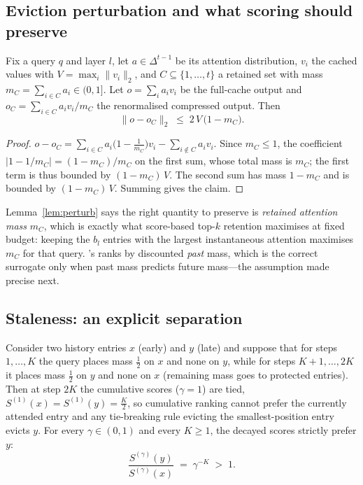\subsection{Eviction perturbation and what scoring should preserve}

\begin{lemma}\label{lem:perturb}
Fix a query $q$ and layer $l$, let $a\in\Delta^{t-1}$ be its attention
distribution, $v_i$ the cached values with
$V=\max_i\|v_i\|_2$, and $C\subseteq\{1,\dots,t\}$ a retained set with
mass $m_C=\sum_{i\in C}a_i\in(0,1]$. Let
$o=\sum_i a_i v_i$ be the full-cache output and
$o_C=\sum_{i\in C}a_i v_i/m_C$ the renormalised compressed output. Then
\begin{equation}
\|o-o_C\|_2 \;\le\; 2\,V\,\bigl(1-m_C\bigr).
\end{equation}
\end{lemma}

\begin{proof}
$o-o_C=\sum_{i\in C}a_i\bigl(1-\tfrac1{m_C}\bigr)v_i
-\sum_{i\notin C}a_i v_i$. Since $m_C\le1$, the coefficient
$|1-1/m_C|=(1-m_C)/m_C$ on the first sum, whose total mass is $m_C$;
the first term is thus bounded by $(1-m_C)\,V$. The second sum has mass
$1-m_C$ and is bounded by $(1-m_C)\,V$. Summing gives the claim.
\end{proof}

Lemma~\ref{lem:perturb} says the right quantity to preserve is
\emph{retained attention mass} $m_C$, which is exactly what score-based
top-$k$ retention maximises at fixed budget: keeping the $b_l$ entries
with the largest instantaneous attention maximises $m_C$ for that query.
\sage{}'s \acs{} ranks by discounted \emph{past} mass, which is the
correct surrogate only when past mass predicts future mass---the
assumption made precise next.

\subsection{Staleness: an explicit separation}

\begin{proposition}\label{prop:staleness}
Consider two history entries $x$ (early) and $y$ (late) and suppose that
for steps $1,\dots,K$ the query places mass $\tfrac12$ on $x$ and none on
$y$, while for steps $K+1,\dots,2K$ it places mass $\tfrac12$ on $y$ and
none on $x$ (remaining mass goes to protected entries). Then at step
$2K$ the cumulative scores ($\gamma=1$) are tied,
$S^{(1)}(x)=S^{(1)}(y)=\tfrac K2$, so cumulative ranking cannot prefer
the currently attended entry and any tie-breaking rule evicting the
smallest-position entry evicts $y$. For every $\gamma\in(0,1)$ and every
$K\ge1$, the decayed scores strictly prefer $y$:
\begin{equation}
\frac{S^{(\gamma)}(y)}{S^{(\gamma)}(x)}
\;=\;\gamma^{-K}\;>\;1 .
\end{equation}
\end{proposition}

